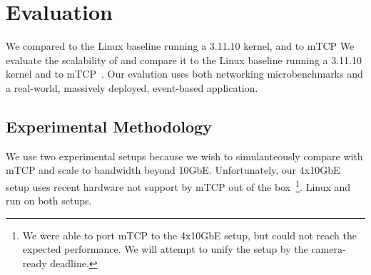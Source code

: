 
\section{Evaluation}
\label{sec:eval}

We compared \ix to the Linux baseline running a 3.11.10 kernel, and to
mTCP We evaluate the scalability of \ix and compare it to the Linux
baseline running a 3.11.10 kernel and to mTCP~\cite{jeong2014mtcp}. 
Our evalution uses both networking microbenchmarks and a real-world,
massively deployed, event-based application. 



\subsection{Experimental Methodology}
\label{sec:eval:setup}

We use two experimental setups because we wish to simulanteously
compare with mTCP and scale to bandwidth beyond 10GbE.  Unfortunately,
our 4x10GbE setup uses recent hardware not support by mTCP out of the
box~\footnote{We were able to port mTCP to the 4x10GbE setup, but
  could not reach the expected performance.  We will attempt to unify
  the setup by the camera-ready deadline.}. Linux and \ix run on both
setups.



